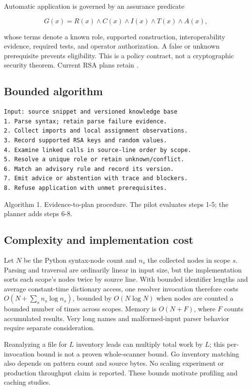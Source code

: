 \documentclass[conference,a4paper]{IEEEtran}
\begin{document}
Automatic application is governed by an assurance predicate

\begin{equation}
G(x)=R(x)\land C(x)\land I(x)\land T(x)\land A(x),
\end{equation}

whose terms denote a known role, supported construction, interoperability evidence, required tests, and operator authorization. A false or unknown prerequisite prevents eligibility. This is a policy contract, not a cryptographic security theorem. Current RSA plans retain .

\subsection{Bounded algorithm}

\begin{lstlisting}
Input: source snippet and versioned knowledge base
1. Parse syntax; retain parse failure evidence.
2. Collect imports and local assignment observations.
3. Record supported RSA keys and random values.
4. Examine linked calls in source-line order by scope.
5. Resolve a unique role or retain unknown/conflict.
6. Match an advisory rule and record its version.
7. Emit advice or abstention with trace and blockers.
8. Refuse application with unmet prerequisites.
\end{lstlisting}

Algorithm 1. Evidence-to-plan procedure. The pilot evaluates steps 1-5; the planner adds steps 6-8.

\subsection{Complexity and implementation cost}

Let \(N\) be the Python syntax-node count and \(n_s\) the collected nodes in scope \(s\). Parsing and traversal are ordinarily linear in input size, but the implementation sorts each scope's nodes twice by source line. With bounded identifier lengths and average constant-time dictionary access, one resolver invocation therefore costs \(O(N+\sum_s n_s\log n_s)\), bounded by \(O(N\log N)\) when nodes are counted a bounded number of times across scopes. Memory is \(O(N+F)\), where \(F\) counts accumulated results. Very long names and malformed-input parser behavior require separate consideration.

Reanalyzing a file for \(L\) inventory leads can multiply total work by \(L\); this per-invocation bound is not a proven whole-scanner bound. Go inventory matching also depends on pattern count and source bytes. No scaling experiment or production throughput claim is reported. These bounds motivate profiling and caching studies.
\end{document}
